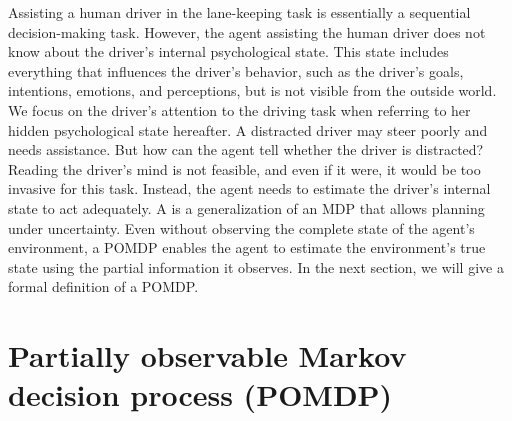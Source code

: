 Assisting a human driver in the lane-keeping task is essentially a sequential decision-making task. However, the agent assisting the human driver does not know about the driver's internal psychological state. This state includes everything that influences the driver's behavior, such as the driver's goals, intentions, emotions, and perceptions, but is not visible from the outside world. We focus on the driver's attention to the driving task when referring to her hidden psychological state hereafter. A distracted driver may steer poorly and needs assistance. But how can the agent tell whether the driver is distracted? Reading the driver's mind is not feasible, and even if it were, it would be too invasive for this task. Instead, the agent needs to estimate the driver's internal state to act adequately. A  is a generalization of an MDP that allows planning under uncertainty. Even without observing the complete state of the agent's environment, a POMDP enables the agent to estimate the environment's true state using the partial information it observes. In the next section, we will give a formal definition of a POMDP.

\section{Partially observable Markov decision process (POMDP)}
\label{sec:pomdp}

